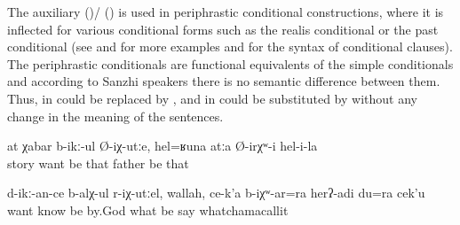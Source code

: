 The auxiliary  ()\slash{} ()  is used in periphrastic conditional constructions, where it is inflected for various conditional forms such as the realis conditional  or the past conditional  (see  and  for more examples and  for the syntax of conditional clauses). The periphrastic conditionals are functional equivalents of the simple conditionals and according to Sanzhi speakers there is no semantic difference between them. Thus, in   could be replaced by , and in   could be substituted by  without any change in the meaning of the sentences.
%
\begin{exe}
	\ex	\label{ex:‎If you want stories, (here is one), she had such a father (and these were the stories about him)}
	\gll	at	χabar	b-ikː-ul	Ø-iχ-utːe,	hel=ʁuna	atːa	Ø-irχʷ-i	hel-i-la\\
			story	want	be	that	father	be	that\\
	\glt	{}

	\ex	\label{ex:‎If I would have known what you want, by God, I would also have said something}
	\gll	d-ikː-an-ce	b-alχ-ul	r-iχ-utːel,	wallah,	ce-k'a	b-iχʷ-ar=ra	herʔ-adi		du=ra	cek'u\\
		want	know	be	by.God	what	be	say		whatchamacallit\\
	\glt	{}
\end{exe}



